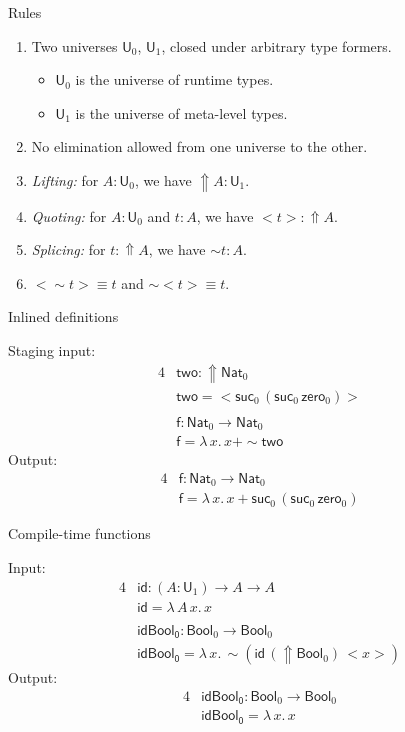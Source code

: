 \documentclass[dvipsnames,aspectratio=169]{beamer}
\newcommand{\msf}[1]{\mathsf{#1}}
\newcommand{\Lift}{{\Uparrow}}
\newcommand{\spl}{{\sim}}
\newcommand{\qut}[1]{{<}#1{>}}
\newcommand{\U}{\msf{U}}
\newcommand{\Bool}{\msf{Bool}}
\newcommand{\Nat}{\msf{Nat}}
\newcommand{\zero}{\msf{zero}}
\newcommand{\suc}{\msf{suc}}
\newcommand{\id}{\msf{id}}
\theoremstyle{remark}
\begin{document}
\begin{frame}{Rules}

  \begin{enumerate}
    \item Two universes $\U_0$, $\U_1$, closed under arbitrary type formers.
      \begin{itemize}
        \item $\U_0$ is the universe of runtime types.
        \item $\U_1$ is the universe of meta-level types.
      \end{itemize}
    \pause
    \item No elimination allowed from one universe to the other.
    \pause
    \item \emph{Lifting:} for $A : \U_0$, we have $\Lift A : \U_1$.
    \pause
    \item \emph{Quoting:} for $A : \U_0$ and $t : A$, we have $\qut{t} : \Lift A$.
    \pause
    \item \emph{Splicing:} for $t : \Lift A$, we have $\spl{t} : A$.
    \pause
    \item $\qut{\spl{t}} \equiv t$ and $\spl{\qut{t}} \equiv t$.
  \end{enumerate}

\end{frame}

\begin{frame}{Inlined definitions}

Staging input:
\begin{alignat*}{4}
  &\msf{two} : \Lift \Nat_0 \\
  &\msf{two} = \qut{\suc_0\,(\suc_0\,\zero_0)} \\
  & \\
  & \msf{f} : \Nat_0 \to \Nat_0 \\
  & \msf{f} = \lambda\,x.\, x + \spl{\msf{two}}
\end{alignat*}
\pause
Output:
\begin{alignat*}{4}
  & \msf{f} : \Nat_0 \to \Nat_0 \\
  & \msf{f} = \lambda\,x.\, x + \suc_0\,(\suc_0\,\zero_0)
\end{alignat*}


\end{frame}

\begin{frame}{Compile-time functions}

Input:
\begin{alignat*}{4}
  & \id : (A : \U_1) \to A \to A\\
  & \id = \lambda\,A\,x.\,x     \\
  & \\
  & \msf{idBool_0} : \Bool_0 \to \Bool_0\\
  & \msf{idBool_0} = \lambda\,x.\,\spl(\id\,(\Lift \Bool_0)\,\qut{x})
\end{alignat*}
\pause
Output:
\begin{alignat*}{4}
  & \msf{idBool_0} : \Bool_0 \to \Bool_0\\
  & \msf{idBool_0} = \lambda\,x.\,x
\end{alignat*}

\end{frame}
\end{document}
